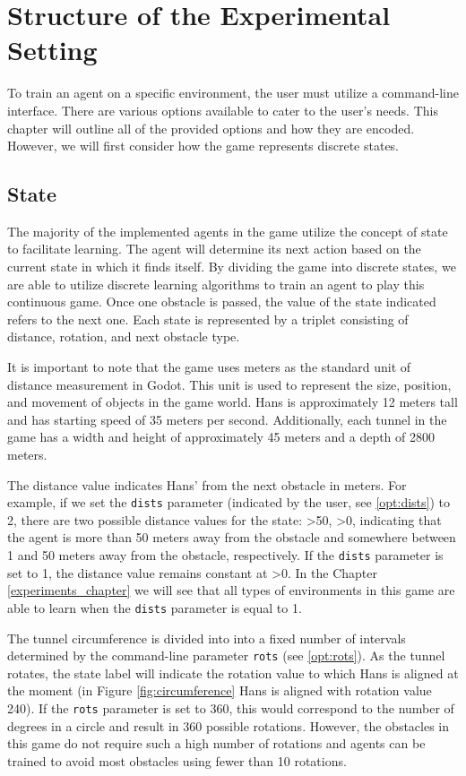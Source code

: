 \chapter{Structure of the Experimental Setting}
\label{agent_code_chapter}
To train an agent on a specific environment, the user must utilize a command-line interface. There are various options available to cater to the user's needs. This chapter will outline all of the provided options and how they are encoded. However, we will first consider how the game represents discrete states.

\section{State}
The majority of the implemented agents in the game utilize the concept of state to facilitate learning. The agent will determine its next action based on the current state in which it finds itself. By dividing the game into discrete states, we are able to utilize discrete learning algorithms to train an agent to play this continuous game. Once one obstacle is passed, the value of the state indicated refers to the next one. Each state is represented by a triplet consisting of distance, rotation, and next obstacle type. 

It is important to note that the game uses meters as the standard unit of distance measurement in Godot. This unit is used to represent the size, position, and movement of objects in the game world. Hans is approximately 12 meters tall and has starting speed of 35 meters per second. Additionally, each tunnel in the game has a width and height of approximately 45 meters and a depth of 2800 meters.

The distance value indicates Hans' from the next obstacle in meters. For example, if we set the \texttt{dists} parameter (indicated by the user, see \ref{opt:dists}) to 2, there are two possible distance values for the state: \textgreater 50, \textgreater 0, indicating that the agent is more than 50 meters away from the obstacle and somewhere between 1 and 50 meters away from the obstacle, respectively. If the \texttt{dists} parameter is set to 1, the distance value remains constant at \textgreater 0. In the Chapter \ref{experiments_chapter} we will see that all types of environments in this game are able to learn when the \texttt{dists} parameter is equal to 1.  

The tunnel circumference is divided into into a fixed number of intervals determined by the command-line parameter \texttt{rots} (see \ref{opt:rots}). As the tunnel rotates, the state label will indicate the rotation value to which Hans is aligned at the moment (in Figure \ref{fig:circumference} Hans is aligned with rotation value 240). If the \texttt{rots} parameter is set to 360, this would correspond to the number of degrees in a circle and result in 360 possible rotations. However, the obstacles in this game do not require such a high number of rotations and agents can be trained to avoid most obstacles using fewer than 10 rotations. 

